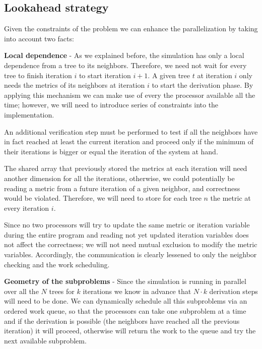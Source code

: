 \documentclass[letterpaper,twoside,11pt]{article}
\begin{document}
\begin{multicols}{2}

\subsection{Lookahead strategy} %
\label{sub:neighbor_checking}

Given the constraints of the problem we can enhance the parallelization by taking into account two facts:
\begin{compactenum}[a)]
\item \textbf{Local dependence} - As we explained before, the simulation has only a local dependence from a tree to its neighbors. Therefore, we need not wait for every tree to finish iteration $i$ to start iteration $i+1$. A given tree $t$ at iteration $i$ only needs the metrics of its neighbors at iteration $i$ to start the derivation phase. By applying this mechanism we can make use of every the processor available all the time; however, we will need to introduce series of constraints into the implementation.

An additional verification step must be performed to test if all the neighbors have in fact reached at least the current iteration and proceed only if the minimum of their iterations is bigger or equal the iteration of the system at hand.

The shared array that previously stored the metrics at each iteration will need another dimension for all the iterations, otherwise, we could potentially be reading a metric from a future iteration of a given neighbor, and correctness would be violated. Therefore, we will need to store for each tree $n$ the metric at every iteration $i$.

Since no two processors will try to update the same metric or iteration variable during the entire program and reading not yet updated iteration variables does not affect the correctness; we will not need mutual exclusion to modify the metric variables. Accordingly, the communication is clearly lessened to only the neighbor checking and the work scheduling.

\item \textbf{Geometry of the subproblems} - Since the simulation is running in parallel over all the $N$ trees for $k$ iterations we know in advance that $N \cdot k $ derivation steps will need to be done. We can dynamically schedule all this subproblems via an ordered work queue, so that the processors can take one subproblem at a time and if the derivation is possible (the neighbors have reached all the previous iteration) it will proceed, otherwise will return the work to the queue and try the next available subproblem.


\end{compactenum}
\end{multicols}
\end{document}
